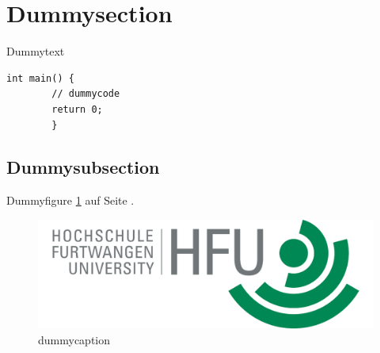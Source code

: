 \documentclass[11pt,a4paper]{article}
\begin{document}
\lstset{language=C}


\clearpage
\setcounter{page}{1}
\tableofcontents

\section{Dummysection}
\setcounter{page}{1}
Dummytext \cite{DIE0}
\begin{lstlisting}[frame=single]
int main() {
        // dummycode
        return 0;
        }
\end{lstlisting}
\subsection{Dummysubsection}
Dummyfigure \ref{hfu} auf Seite \pageref{hfu}.

\begin{figure}[h!]
  \caption{dummycaption}
  \label{hfu}
  \centering
    \includegraphics[scale=1]{hfu.png}
\end{figure}

\nocite{*}
\printbibliography
{}
\end{document}
